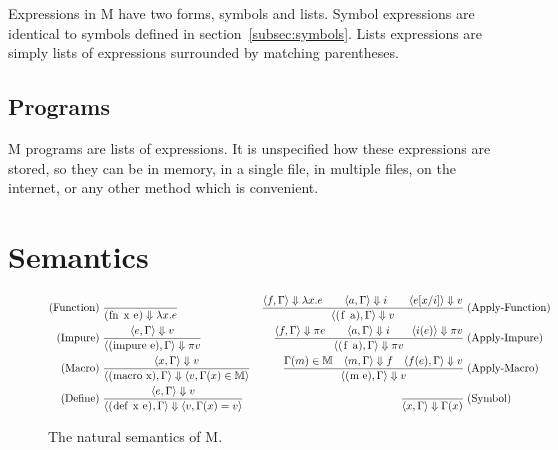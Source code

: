 \documentclass{article}
\begin{document}
\begin{multicols}{2}
        Expressions in M have two forms, symbols and lists.
        Symbol expressions are identical to symbols defined in section~\ref{subsec:symbols}.
        Lists expressions are simply lists of expressions surrounded by matching parentheses.

        \subsection{Programs}\label{subsec:programs}

        M programs are lists of expressions.
        It is unspecified how these expressions are stored, so they can be in memory, in a single file, in multiple files, on the internet, or any other method which is convenient.
    \end{multicols}
    \newpage

    \section{Semantics}\label{sec:semantics}

    \begin{figure}[h]
        \centering
        \begin{align*}
            \text{(Function)}\;&\dfrac{}{\lstinline$(fn x e)$\Downarrow\lambda x.e}
            &\dfrac{\langle f,\Gamma\rangle\Downarrow\lambda x.e\qquad\langle a,\Gamma\rangle\Downarrow i\qquad\langle e[x/i]\rangle\Downarrow v}{\langle\lstinline$(f a)$,\Gamma\rangle\Downarrow v}\;&\text{(Apply-Function)}\\
            \text{(Impure)}\;&\dfrac{\langle e,\Gamma\rangle\Downarrow v}{\langle\lstinline$(impure e)$,\Gamma\rangle\Downarrow\pi v}
            &\dfrac{\langle f,\Gamma\rangle\Downarrow\pi e\qquad\langle a,\Gamma\rangle\Downarrow i\qquad\langle i(e)\rangle\Downarrow\pi v}{\langle\lstinline$(f a)$,\Gamma\rangle\Downarrow\pi v}\;&\text{(Apply-Impure)}\\
            \text{(Macro)}\;&\dfrac{\langle x,\Gamma\rangle\Downarrow v}{\langle\lstinline$(macro x)$,\Gamma\rangle\Downarrow\langle v,\Gamma(x)\in\mathbb{M}\rangle}
            &\dfrac{\Gamma(m)\in\mathbb{M}\quad\langle m,\Gamma\rangle\Downarrow f\quad\langle f(e),\Gamma\rangle\Downarrow v}{\langle\lstinline$(m e)$,\Gamma\rangle\Downarrow v}\;&\text{(Apply-Macro)}\\
            \text{(Define)}\;&\dfrac{\langle e,\Gamma\rangle\Downarrow v}{\langle\lstinline$(def x e)$,\Gamma\rangle\Downarrow\langle v,\Gamma(x) = v\rangle}
            &\dfrac{}{\langle x,\Gamma\rangle\Downarrow\Gamma(x)}\;&\text{(Symbol)}
        \end{align*}
        \caption{The natural semantics of M.}
    \end{figure}
\end{document}
